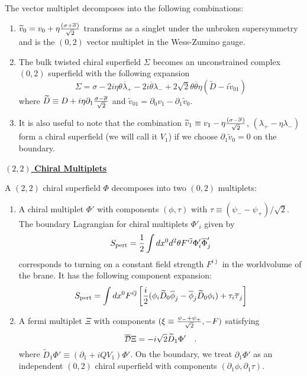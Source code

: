 \documentclass[a4paper,12pt]{article}
\begin{document}
The vector multiplet decomposes into the following combinations:
\begin{enumerate}
\item  $\widetilde{v}_0=v_0+\eta{{(\sigma+ \overline{\sigma})}\over\sqrt2}$
transforms as a singlet under the unbroken supersymmetry 
and is the $(0,2)$ vector multiplet in the Wess-Zumino gauge.
\item The bulk twisted chiral superfield $\Sigma$ becomes an
unconstrained  complex $(0,2)$ superfield with the following
expansion
\begin{equation}
\Sigma = \sigma -2i\eta\theta \overline{\lambda}_+ -2i\overline{\theta}
\lambda_- + 2 \sqrt2\theta \overline{\theta}\eta (\widetilde{D}
-i\widetilde{v}_{01}) 
\end{equation}
where $\widetilde{D}\equiv D +i\eta
\partial_1{{\sigma-\overline{\sigma}}\over\sqrt2}$ and
$\widetilde{v}_{01} = \partial_0 v_1  - \partial_1 \widetilde{v}_0$.
\item It is also useful to note that the combination
$\widetilde{v}_1\equiv
v_1-\eta {{(\sigma-\overline{\sigma})}\over\sqrt2}$, $(\lambda_+ -\eta
\lambda_-)$ form a chiral superfield (we will call it $V_1$) if we choose
$\partial_1 \widetilde{v}_0=0$ on the boundary. 
\end{enumerate}


\begin{flushleft}
\underline{\bf $(2,2)$ Chiral Multiplets}
\end{flushleft}

A $(2,2)$ chiral superfield $\Phi$ decomposes into two $(0,2)$
multiplets: 
\begin{enumerate}
\item A chiral multiplet $\Phi'$ with components $(\phi,\tau)$ 
with $\tau\equiv (\psi_- - \psi_+)/\sqrt2$. The boundary Lagrangian
for chiral multiplets $\Phi'_i$ given by
\begin{equation}
S_{\rm pert} = {1\over2}\int dx^0 d^2\theta F^{i\overline{\jmath}} 
\Phi'_i \overline{\Phi}'_j
\end{equation}
corresponds to turning on a constant field strength $F^{i\overline{\jmath}}$
in the worldvolume of the brane. It has the following
component expansion:
\begin{equation}
S_{\rm pert} = \int dx^0  F^{i\overline{\jmath}}
\left[ {i\over2} (\phi_i \widetilde{D}_0 \overline{\phi}_j -
\overline{\phi}_j \widetilde{D}_0 \phi_i) + \tau_i \overline{\tau}_j \right]
\end{equation}
\item A fermi multiplet
$\Xi$ with components $(\xi\equiv {{\psi_-+\psi_+}\over\sqrt2},-F)$ satisfying 
$$ \overline{\cal D} \Xi =-i\sqrt2 \widetilde{D}_1 \Phi' \quad. $$
where $\widetilde{D}_1\Phi'\equiv (\partial_1 +i Q V_1)\Phi'$. On the
boundary, we treat $\partial_1\Phi'$ as an independent $(0,2)$ chiral
superfield with components $(\partial_1\phi,\partial_1\tau)$.
\end{enumerate}
\end{document}
